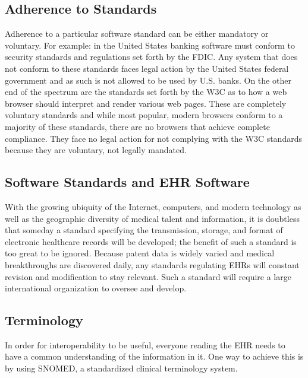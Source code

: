 \documentclass[14pt]{article}
\begin{document}
\subsection{Adherence to Standards}
Adherence to a particular software standard can be either mandatory or voluntary. For example: in the United States banking software must conform to security standards and regulations set forth by the \gls{FDIC}. Any system that does not conform to these standards faces legal action by the United States federal government and as such is not allowed to be used by U.S. banks. On the other end of the spectrum are the standards set forth by the \gls{W3C} as to how a web browser should interpret and render various web pages. These are completely voluntary standards and while most popular, modern browsers conform to a majority of these standards, there are no browsers that achieve complete compliance. They face no legal action for not complying with the \gls{W3C} standards because they are voluntary, not legally mandated.

\subsection{Software Standards and EHR Software}
With the growing ubiquity of the Internet, computers, and modern technology as well as the geographic diversity of medical talent and information, it is doubtless that someday a standard specifying the transmission, storage, and format of electronic healthcare records will be developed; the benefit of such a standard is too great to be ignored. Because patent data is widely varied and medical breakthroughs are discovered daily, any standards regulating \glspl{EHR} will constant revision and modification to stay relevant. Such a standard will require a large international organization to oversee and develop.


\subsection{Terminology}
In order for interoperability to be useful, everyone reading the \gls{EHR} needs to have a common understanding of the information in it. One way to achieve this is by using \gls{SNOMED}, a standardized clinical terminology system.
\end{document}
